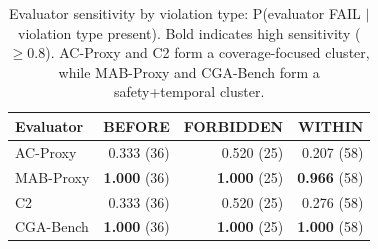 \begin{table}[htbp]
\centering
\caption{Evaluator sensitivity by violation type: P(evaluator FAIL $\mid$ violation type present). Bold indicates high sensitivity ($\geq 0.8$). AC-Proxy and C2 form a coverage-focused cluster, while MAB-Proxy and CGA-Bench form a safety+temporal cluster.}
\label{tab:evaluator_violation_crosstab}
\begin{tabular}{lrrr}
\toprule
Evaluator & BEFORE & FORBIDDEN & WITHIN \\
\midrule
AC-Proxy & 0.333 (36) & 0.520 (25) & 0.207 (58) \\
MAB-Proxy & \textbf{1.000} (36) & \textbf{1.000} (25) & \textbf{0.966} (58) \\
C2 & 0.333 (36) & 0.520 (25) & 0.276 (58) \\
CGA-Bench & \textbf{1.000} (36) & \textbf{1.000} (25) & \textbf{1.000} (58) \\
\bottomrule
\end{tabular}
\end{table}
